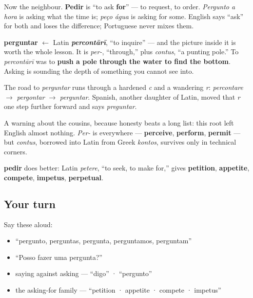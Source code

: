 Now the neighbour. \textbf{Pedir} is \textquotedblleft{}to ask \textbf{for}\textquotedblright{} — to request, to order. \emph{Pergunto a hora} is asking what the time is; \emph{peço água} is asking for some. English says \textquotedblleft{}ask\textquotedblright{} for both and loses the difference; Portuguese never mixes them.

\begin{cousinweb}
\textbf{perguntar} $\leftarrow$ Latin \emph{\textbf{percontārī}}, \textquotedblleft{}to inquire\textquotedblright{} — and the picture inside it is worth the whole lesson. It is \emph{per-}, \textquotedblleft{}through,\textquotedblright{} plus \emph{contus}, \textquotedblleft{}a punting pole.\textquotedblright{} To \emph{percontārī} was to \textbf{push a pole through the water to find the bottom}. Asking is sounding the depth of something you cannot see into.

The road to \emph{perguntar} runs through a hardened \emph{c} and a wandering \emph{r}: \emph{percontare} $\to$ \emph{pergontar} $\to$ \emph{perguntar}. Spanish, another daughter of Latin, moved that \emph{r} one step further forward and says \emph{preguntar}.

A warning about the cousins, because honesty beats a long list: this root left English almost nothing. \emph{Per-} is everywhere — \textbf{perceive}, \textbf{perform}, \textbf{permit} — but \emph{contus}, borrowed into Latin from Greek \emph{kontos}, survives only in technical corners.

\textbf{pedir} does better: Latin \emph{petere}, \textquotedblleft{}to seek, to make for,\textquotedblright{} gives \textbf{petition}, \textbf{appetite}, \textbf{compete}, \textbf{impetus}, \textbf{perpetual}.
\end{cousinweb}

\subsection*{Your turn}
Say these aloud:

\begin{itemize}
\raggedright
  \item \textquotedblleft{}pergunto, perguntas, pergunta, perguntamos, perguntam\textquotedblright{}
  \item \textquotedblleft{}Posso fazer uma pergunta?\textquotedblright{}
  \item saying against asking — \textquotedblleft{}digo\textquotedblright{} · \textquotedblleft{}pergunto\textquotedblright{}
  \item the asking-for family — \textquotedblleft{}petition · appetite · compete · impetus\textquotedblright{}
\end{itemize}

